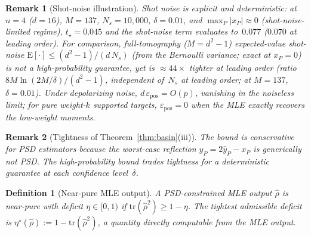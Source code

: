 \documentclass[twocolumn,prx,aps,superscriptaddress,longbibliography,floatfix]{revtex4-2}
\newtheorem{definition}{Definition}
\newtheorem*{remark}{Remark}
\begin{document}
\begin{remark}[Shot-noise illustration]
Shot noise is explicit and deterministic:
at $n = 4$ ($d = 16$), $M = 137$, $N_s = 10{,}000$,
$\delta = 0.01$, and $\max_P |x_P| \approx 0$
(shot-noise-limited regime),
$t_\star = 0.045$ and the
shot-noise term evaluates to~$0.077$
($0.070$ at leading order).
For comparison, full-tomography ($M = d^2{-}1$) expected-value
shot-noise $\mathrm{E}[\cdot] \le (d^2{-}1)/(d\,N_s)$
(from the Bernoulli variance; exact at $x_P = 0$)
is not a high-probability guarantee, yet is
$\approx 44\times$ tighter at leading order
(ratio $8M\ln(2M/\delta)/(d^2{-}1)$, independent
of~$N_s$ at leading order; at $M = 137$, $\delta = 0.01$).
Under depolarizing noise,
$d\,\varepsilon_{\mathrm{pos}} = O(p)$, vanishing
in the noiseless limit;
for pure weight-$k$ supported targets, $\varepsilon_{\mathrm{pos}} = 0$
when the MLE exactly recovers the low-weight moments.
\end{remark}

\begin{remark}[Tightness of Theorem~\ref{thm:basin}(iii)]
The bound is conservative for PSD estimators
because the worst-case reflection $y_P = 2\hat{y}_P - x_P$ is
generically not PSD.
The high-probability bound trades tightness for
a deterministic guarantee at each confidence level~$\delta$.
\end{remark}

\begin{definition}[Near-pure MLE output]
\label{def:near-pure}
A PSD-constrained MLE output $\hat\rho$ is \emph{near-pure with
deficit $\eta \in [0, 1)$} if $\mathrm{tr}(\hat\rho^2) \ge 1 - \eta$.
The tightest admissible deficit is
$\eta^{\star}(\hat\rho) := 1 - \mathrm{tr}(\hat\rho^2)$,
a quantity directly computable from the MLE output.
\end{definition}
\end{document}
